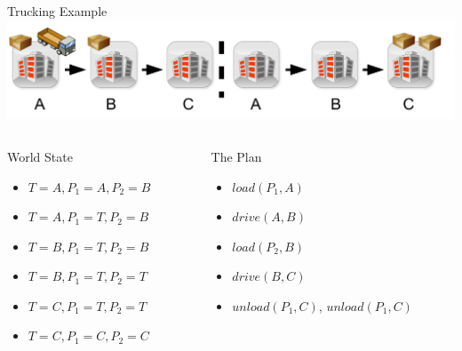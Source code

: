 \documentclass[t]{sdqbeamer}
\begin{document}
\begin{frame}{Trucking Example}
\includegraphics[scale=0.65]{figures/l10/plan-example.pdf}\\

\begin{columns}
\begin{column}{0.5\textwidth}
World State
\begin{itemize}
	\item $T=A, P_1=A, P_2=B$
	\item $T=A, P_1=T, P_2=B$
	\item $T=B, P_1=T, P_2=B$
	\item $T=B, P_1=T, P_2=T$
	\item $T=C, P_1=T, P_2=T$
	\item $T=C, P_1=C, P_2=C$
\end{itemize}
\end{column}
\begin{column}{0.5\textwidth}
The Plan
\begin{itemize}
	\item $load(P_1,A)$
	\item $drive(A,B)$
	\item $load(P_2,B)$
	\item $drive(B,C)$
	\item $unload(P_1,C)$, $unload(P_1,C)$
\end{itemize}
\hspace{1em}
\end{column}
\end{columns}
\end{frame}
\end{document}
